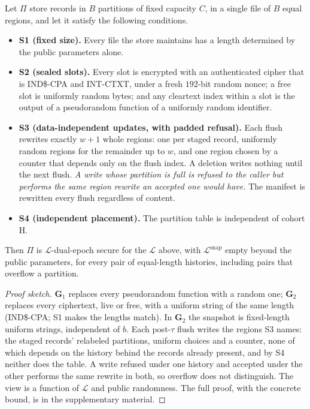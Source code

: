 \begin{theorem}
\label{thm:main}
Let $\Pi$ store records in $B$ partitions of fixed capacity $C$, in a single file of $B$ equal
regions, and let it satisfy the following conditions.
\begin{itemize}
\item \textbf{S1 (fixed size).} Every file the store maintains has a length determined by the public
parameters alone.
\item \textbf{S2 (sealed slots).} Every slot is encrypted with an authenticated cipher that is
IND\$-CPA and INT-CTXT, under a fresh $192$-bit random nonce; a free slot is uniformly random bytes;
and any cleartext index within a slot is the output of a pseudorandom function of a uniformly random
identifier.
\item \textbf{S3 (data-independent updates, with padded refusal).} Each flush rewrites exactly $w+1$
whole regions: one per staged record, uniformly random regions for the remainder up to $w$, and one
region chosen by a counter that depends only on the flush index. A deletion writes nothing until the
next flush. \emph{A write whose partition is full is refused to the caller but performs the same
region rewrite an accepted one would have.} The manifest is rewritten every flush regardless of
content.
\item \textbf{S4 (independent placement).} The partition table is independent of cohort H.
\end{itemize}
Then $\Pi$ is $\mathcal{L}$-dual-epoch secure for the $\mathcal{L}$ above, with
$\mathcal{L}^{\mathrm{snap}}$ empty beyond the public parameters, for every pair of equal-length
histories, including pairs that overflow a partition.
\end{theorem}

\begin{proof}[Proof sketch]
$\mathbf{G}_1$ replaces every pseudorandom function with a random one; $\mathbf{G}_2$ replaces
every ciphertext, live or free, with a uniform string of the same length (IND\$-CPA; S1 makes the
lengths match). In $\mathbf{G}_2$ the snapshot is fixed-length uniform strings, independent of $b$.
Each post-$\tau$ flush writes the regions S3 names: the staged records' relabeled partitions, uniform
choices and a counter, none of which depends on the history behind the records already present, and
by S4 neither does the table. A write refused under one history and accepted under the other
performs the same rewrite in both, so overflow does not distinguish. The view is a function of
$\mathcal{L}$ and public randomness. The full proof, with the concrete bound, is in the supplementary
material.
\end{proof}

